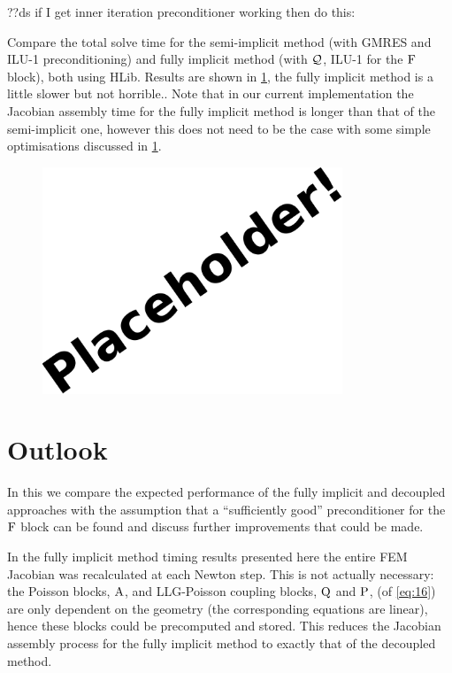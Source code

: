 ??ds if I get inner iteration preconditioner working then do this:

Compare the total solve time for the semi-implicit method (with GMRES and ILU-1 preconditioning) and fully implicit method (with $\mathcal{Q}$, ILU-1 for the $\mathrm{F}$ block), both using HLib.
Results are shown in \cref{fig:times-semi-vs-fully-implicit}, the fully implicit method is a little slower but not horrible..
Note that in our current implementation the Jacobian assembly time for the fully implicit method is longer than that of the semi-implicit one, however this does not need to be the case with some simple optimisations discussed in \cref{sec:furth-optim-opport}.

\begin{figure}
  \centering
  \includegraphics[width=0.8\textwidth]{images/placeholder}
  \caption{}
  \label{fig:times-semi-vs-fully-implicit}
\end{figure}


\section{Outlook}
\label{sec:furth-optim-opport}

In this  we compare the expected performance of the fully implicit and decoupled approaches with the assumption that a ``sufficiently good'' preconditioner for the $\mathrm{F}$ block can be found and discuss further improvements that could be made.

In the fully implicit method timing results presented here the entire FEM Jacobian was recalculated at each Newton step.
This is not actually necessary: the Poisson blocks, $\mathrm{A}$, and LLG-Poisson coupling blocks, $\mathrm{Q}$ and $\mathrm{P}$, (of \cref{eq:16}) are only dependent on the geometry (\ie the corresponding equations are linear), hence these blocks could be precomputed and stored.
This reduces the Jacobian assembly process for the fully implicit method to exactly that of the decoupled method.

